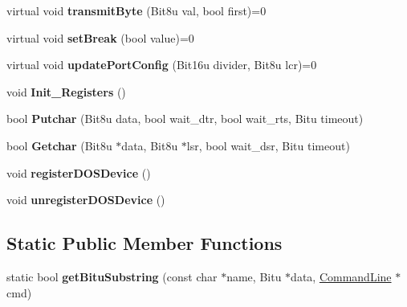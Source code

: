 \begin{DoxyCompactItemize}
\item 
\hypertarget{classCSerial_a7a520bb7b440fb401858b04817911e40}{virtual void {\bfseries transmit\-Byte} (Bit8u val, bool first)=0}\label{classCSerial_a7a520bb7b440fb401858b04817911e40}

\item 
\hypertarget{classCSerial_addc5a34780ee353f12938e5a9e415e26}{virtual void {\bfseries set\-Break} (bool value)=0}\label{classCSerial_addc5a34780ee353f12938e5a9e415e26}

\item 
\hypertarget{classCSerial_a55aa5e9e9dc361068c5388fee1bb14e3}{virtual void {\bfseries update\-Port\-Config} (Bit16u divider, Bit8u lcr)=0}\label{classCSerial_a55aa5e9e9dc361068c5388fee1bb14e3}

\item 
\hypertarget{classCSerial_af5cb5a4a7736486967d4c4ffa65aa4b9}{void {\bfseries Init\-\_\-\-Registers} ()}\label{classCSerial_af5cb5a4a7736486967d4c4ffa65aa4b9}

\item 
\hypertarget{classCSerial_a08815d6c2f3e806df2a9c33130451402}{bool {\bfseries Putchar} (Bit8u data, bool wait\-\_\-dtr, bool wait\-\_\-rts, Bitu timeout)}\label{classCSerial_a08815d6c2f3e806df2a9c33130451402}

\item 
\hypertarget{classCSerial_a6b5cb502f087dd0dfcc167850fd862e9}{bool {\bfseries Getchar} (Bit8u $\ast$data, Bit8u $\ast$lsr, bool wait\-\_\-dsr, Bitu timeout)}\label{classCSerial_a6b5cb502f087dd0dfcc167850fd862e9}

\item 
\hypertarget{classCSerial_afe1ce6961b0ea41e443aa12b3cb2cf3e}{void {\bfseries register\-D\-O\-S\-Device} ()}\label{classCSerial_afe1ce6961b0ea41e443aa12b3cb2cf3e}

\item 
\hypertarget{classCSerial_ae27ec35dbb2623318271adb009077a76}{void {\bfseries unregister\-D\-O\-S\-Device} ()}\label{classCSerial_ae27ec35dbb2623318271adb009077a76}

\end{DoxyCompactItemize}
\subsection*{Static Public Member Functions}
\begin{DoxyCompactItemize}
\item 
\hypertarget{classCSerial_a82488f4091ff6dfa6b40c708642f3df4}{static bool {\bfseries get\-Bitu\-Substring} (const char $\ast$name, Bitu $\ast$data, \hyperlink{classCommandLine}{Command\-Line} $\ast$cmd)}\label{classCSerial_a82488f4091ff6dfa6b40c708642f3df4}

\end{DoxyCompactItemize}
